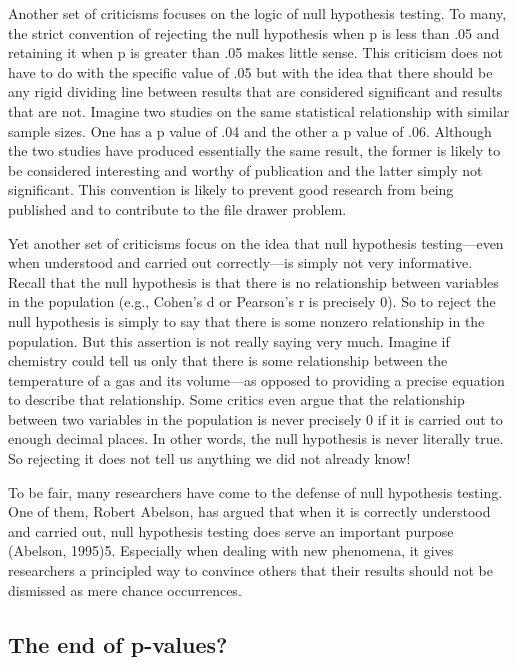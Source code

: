 Another set of criticisms focuses on the logic of null hypothesis testing. To many, the strict convention of rejecting the null hypothesis when p is less than .05 and retaining it when p is greater than .05 makes little sense. This criticism does not have to do with the specific value of .05 but with the idea that there should be any rigid dividing line between results that are considered significant and results that are not. Imagine two studies on the same statistical relationship with similar sample sizes. One has a p value of .04 and the other a p value of .06. Although the two studies have produced essentially the same result, the former is likely to be considered interesting and worthy of publication and the latter simply not significant. This convention is likely to prevent good research from being published and to contribute to the file drawer problem.


Yet another set of criticisms focus on the idea that null hypothesis testing---even when understood and carried out correctly---is simply not very informative. Recall that the null hypothesis is that there is no relationship between variables in the population (e.g., Cohen's d or Pearson's r is precisely 0). So to reject the null hypothesis is simply to say that there is some nonzero relationship in the population. But this assertion is not really saying very much. Imagine if chemistry could tell us only that there is some relationship between the temperature of a gas and its volume---as opposed to providing a precise equation to describe that relationship. Some critics even argue that the relationship between two variables in the population is never precisely 0 if it is carried out to enough decimal places. In other words, the null hypothesis is never literally true. So rejecting it does not tell us anything we did not already know!


To be fair, many researchers have come to the defense of null hypothesis testing. One of them, Robert Abelson, has argued that when it is correctly understood and carried out, null hypothesis testing does serve an important purpose (Abelson, 1995)5. Especially when dealing with new phenomena, it gives researchers a principled way to convince others that their results should not be dismissed as mere chance occurrences.


\subsection{The end of p-values?}


